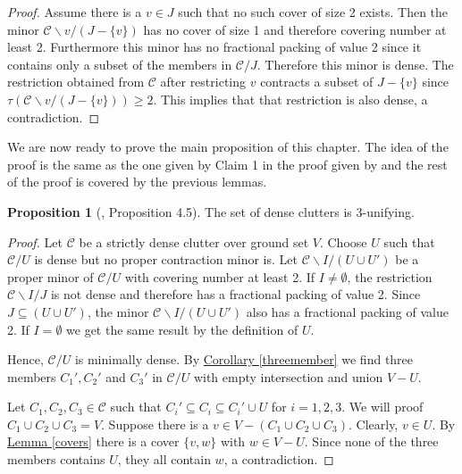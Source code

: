 \documentclass[a4paper, 12pt, twoside=false]{scrbook}
\theoremstyle{definition}
\newtheorem{proposition}[theorem]{Proposition}
\begin{document}
   \begin{proof}
       Assume there is a $v \in J$ such that no such cover of size 2 exists.
       Then the minor $\mathcal{C} \backslash v/ (J-\{v\})$ has no cover of size 1 and therefore covering number at least 2.
       Furthermore this minor has no fractional packing of value 2 since it contains only a subset of the members in $\mathcal{C} / J$.
       Therefore this minor is dense.
       The restriction obtained from $\mathcal{C}$ after restricting $v$ contracts a subset of $J-\{v\}$ since $\tau(\mathcal{C} \backslash v/ (J-\{v\}))\geq 2$.
       This implies that that restriction is also dense, a contradiction.
   \end{proof}

   We are now ready to prove the main proposition of this chapter.
   The idea of the proof is the same as the one given by Claim 1 in the proof given by \cite{restrictions} and the rest of the proof is covered by the previous lemmas.
   \begin{proposition}[\cite{restrictions}, Proposition 4.5]
       The set of dense clutters is 3-unifying.
   \end{proposition}

   \begin{proof}
       Let $\mathcal{C}$ be a strictly dense clutter over ground set $V$.
       Choose $U$ such that $\mathcal{C} / U$ is dense but no proper contraction minor is.
       Let $\mathcal{C} \backslash I / (U \cup U')$ be a proper minor of $\mathcal{C} /U$ with covering number at least 2.
       If $I \neq \emptyset$, the restriction $\mathcal{C} \backslash I / J$ is not dense and therefore has a fractional packing of value 2.
       Since $J \subseteq (U \cup U')$, the minor $\mathcal{C} \backslash I / (U \cup U')$ also has a fractional packing of value 2.
       If $I=\emptyset$ we get the same result by the definition of $U$.

       Hence, $\mathcal{C}/U$ is minimally dense.
       By \hyperref[threemember]{Corollary \ref*{threemember}} we find three members $C_1', C_2'$ and $C_3'$ in $\mathcal{C}/U$ with empty intersection and union $V - U$.

       Let $C_1, C_2, C_3 \in \mathcal{C}$ such that $C_i' \subseteq C_i \subseteq C_i' \cup U$ for $i=1,2,3$.
       We will proof $C_1 \cup C_2 \cup C_3 = V$.
       Suppose there is a $v \in V-(C_1 \cup C_2 \cup C_3)$.
       Clearly, $v \in U$.
       By \hyperref[covers]{Lemma \ref*{covers}} there is a cover $\{v,w\}$ with $w \in V-U$.
       Since none of the three members contains $U$, they all contain $w$, a contradiction.
   \end{proof}
\end{document}
